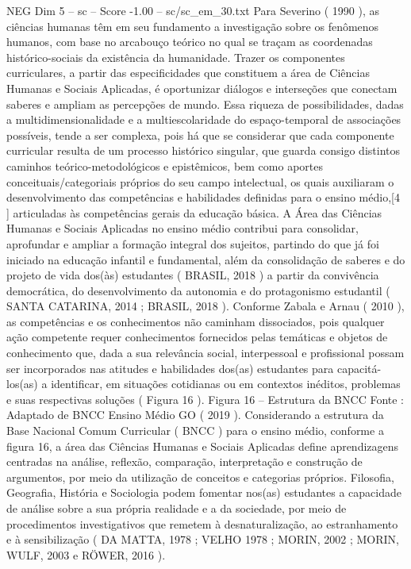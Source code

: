 \begin{textsample}{NEG Dim 5 – sc – Score -1.00 – sc/sc\_em\_30.txt}
Para Severino ( 1990 ), as ciências humanas têm em seu fundamento a investigação sobre os fenômenos humanos, com base no arcabouço teórico no qual se traçam as coordenadas histórico-sociais da existência da humanidade.
Trazer os componentes curriculares, a partir das especificidades que constituem a área de Ciências Humanas e Sociais Aplicadas, é oportunizar diálogos e interseções que conectam saberes e ampliam as percepções de mundo.
Essa riqueza de possibilidades, dadas a multidimensionalidade e a multiescolaridade do espaço-temporal de associações possíveis, tende a ser complexa, pois há que se considerar que cada componente curricular resulta de um processo histórico singular, que guarda consigo distintos caminhos teórico-metodológicos e epistêmicos, bem como aportes conceituais/categoriais próprios do seu campo intelectual, os quais auxiliaram o desenvolvimento das competências e habilidades definidas para o ensino médio,[4 ] articuladas às competências gerais da educação básica.
A Área das Ciências Humanas e Sociais Aplicadas no ensino médio contribui para consolidar, aprofundar e ampliar a formação integral dos sujeitos, partindo do que já foi iniciado na educação infantil e fundamental, além da consolidação de saberes e do projeto de vida dos(às) estudantes ( BRASIL, 2018 ) a partir da convivência democrática, do desenvolvimento da autonomia e do protagonismo estudantil ( SANTA CATARINA, 2014 ; BRASIL, 2018 ).
Conforme Zabala e Arnau ( 2010 ), as competências e os conhecimentos não caminham dissociados, pois qualquer ação competente requer conhecimentos fornecidos pelas temáticas e objetos de conhecimento que, dada a sua relevância social, interpessoal e profissional possam ser incorporados nas atitudes e habilidades dos(as) estudantes para capacitá-los(as) a identificar, em situações cotidianas ou em contextos inéditos, problemas e suas respectivas soluções ( Figura 16 ).
Figura 16 – Estrutura da BNCC Fonte : Adaptado de BNCC Ensino Médio GO ( 2019 ).
Considerando a estrutura da Base Nacional Comum Curricular ( BNCC ) para o ensino médio, conforme a figura 16, a área das Ciências Humanas e Sociais Aplicadas define aprendizagens centradas na análise, reflexão, comparação, interpretação e construção de argumentos, por meio da utilização de conceitos e categorias próprios.
Filosofia, Geografia, História e Sociologia podem fomentar nos(as) estudantes a capacidade de análise sobre a sua própria realidade e a da sociedade, por meio de procedimentos investigativos que remetem à desnaturalização, ao estranhamento e à sensibilização ( DA MATTA, 1978 ; VELHO 1978 ; MORIN, 2002 ; MORIN, WULF, 2003 e RÖWER, 2016 ).

\end{textsample}
